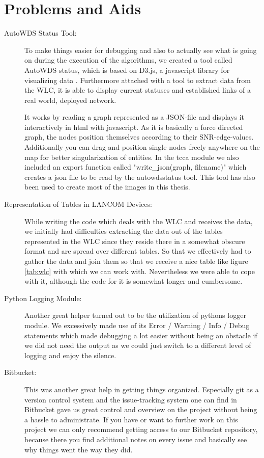   \section{Problems and Aids}
    \begin{description}
    \item [AutoWDS Status Tool:]
      To make things easier for debugging and also to actually see what is going on during the execution of the algorithms,
      we created a tool called AutoWDS status, which is based on D3.js, a javascript library for visualizing data \cite{d3js}.
      Furthermore attached with a tool to extract data from the \ac{WLC}, it is able to display current statuses and established links of a real world, deployed network.
      
      It works by reading a graph represented as a \ac{JSON}-file and displays it interactively in html with javascript.
      As it is basically a force directed graph, the nodes position themselves according to their \ac{SNR}-edge-values. 
      Additionally you can drag and position single nodes freely anywhere on the map for better singularization of entities.
      In the tcca module we also included an export function called "write\_json(graph, filename)" which creates a json file to be read by the autowdsstatus tool.
      This tool has also been used to create most of the images in this thesis.

    \item [Representation of Tables in LANCOM Devices:]
      While writing the code which deals with the \ac{WLC} and receives the data, 
      we initially had difficulties extracting the data out of the tables represented in the \ac{WLC} since
      they reside there in a somewhat obscure format and are spread over different tables. So that we effectively had to gather the data and join them so that we receive a
      nice table like figure \ref{tab:wlc} with which we can work with. 
      Nevertheless we were able to cope with it, although the code for it is somewhat longer and cumbersome.

    \item [Python Logging Module:]
      Another great helper turned out to be the utilization of pythons logger module. 
      We excessively made use of its Error / Warning / Info / Debug statements which made debugging
      a lot easier without being an obstacle if we did not need the output as we could just switch to a different level of logging and enjoy the silence.
    
    \item [Bitbucket:]
      This was another great help in getting things organized. Especially git \cite{git} 
      as a version control system and the issue-tracking system one can find in Bitbucket \cite{bitbucket}
      gave us great control and overview on the project without being a hassle to administrate. 
      If you have or want to further work on this project we can only recommend
      getting access to our Bitbucket repository, because there you find additional notes on every issue and basically see why things went the way they did.
      

\end{description}
